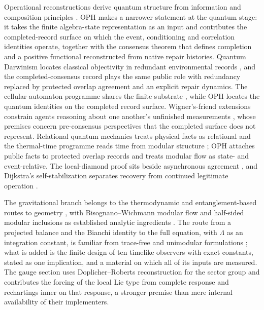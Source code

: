 \documentclass[11pt]{article}
\theoremstyle{definition}
\theoremstyle{remark}
\begin{document}
Operational reconstructions derive quantum structure from information and
composition principles \cite{hardy2001,chiribella2011,masanes2011}. OPH makes
a narrower statement at the quantum stage: it takes the finite algebra-state
representation as an input and contributes the completed-record surface on
which the event, conditioning and correlation identities operate, together
with the consensus theorem that defines completion and a positive functional
reconstructed from native repair histories. Quantum Darwinism
locates classical objectivity in redundant environmental records
\cite{zurek2003}, and the completed-consensus record plays the same public
role with redundancy replaced by protected overlap agreement and an explicit
repair dynamics. The cellular-automaton programme shares the finite substrate
\cite{thooft2016}, while OPH locates the quantum identities on the completed
record surface. Wigner's-friend extensions constrain agents reasoning about
one another's unfinished measurements \cite{fr2018}, whose premises concern
pre-consensus perspectives that the completed surface does not represent.
Relational quantum mechanics treats physical facts as relational
\cite{rovelli1996} and the thermal-time programme reads time from modular
structure \cite{connesrovelli1994}; OPH attaches public facts to protected
overlap records and treats modular flow as state- and event-relative.
The local-diamond proof sits beside asynchronous agreement \cite{lamport1982,flp1985}, and
Dijkstra's self-stabilization separates recovery from continued legitimate
operation \cite{dijkstra1974}.

The gravitational branch belongs to the thermodynamic and
entanglement-based routes to geometry \cite{jacobson95,jacobson16,vanraamsdonk2010},
with Bisognano--Wichmann modular flow and half-sided modular inclusions as
established analytic ingredients \cite{bw75,bw76,wiesbrock93}. The route from
a projected balance and the Bianchi identity to the full equation, with
$\Lambda$ as an integration constant, is familiar from trace-free and
unimodular formulations \cite{vdbij1982,ellis2011}; what is added is the
finite design of ten timelike observers with exact constants, stated as one
implication, and a material on which all of its inputs are measured. The gauge section uses
Doplicher--Roberts reconstruction for the sector group \cite{dr89,dr90} and
contributes the forcing of the local Lie type from complete response and
rechartings inner on that response, a stronger premise than mere internal
availability of their implementers.
\end{document}
